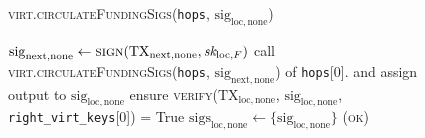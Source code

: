 \begin{figure}[H]
\begin{processbox}{\textsc{virt.circulateFundingSigs}(\texttt{hops},
      $\mathrm{sig}_{\mathrm{loc}, \mathrm{none}}$)}
\begin{algorithmic}[1]
        \State $\mathrm{sig}_{\mathrm{next}, \mathrm{none}} \gets
        \textsc{sign}(\mathrm{TX}_{\mathrm{next}, \mathrm{none}},
        \textit{sk}_{\mathrm{loc}, F})$
        \State call \textsc{virt.circulateFundingSigs}(\texttt{hops},
        $\mathrm{sig}_{\mathrm{next}, \mathrm{none}}$) of \texttt{hops}[0].\bob
        and assign output to $\mathrm{sig}_{\mathrm{loc}, \mathrm{none}}$
        \State ensure \textsc{verify}($\mathrm{TX}_{\mathrm{loc},
        \mathrm{none}}$, $\mathrm{sig}_{\mathrm{loc}, \mathrm{none}}$,
        \texttt{right\_virt\_keys}[0]) = True
        \State $\mathrm{sigs}_{\mathrm{loc}, \mathrm{none}} \gets \{
        \mathrm{sig}_{\mathrm{loc}, \mathrm{none}} \}$
        \State \Return (\textsc{ok})
      \EndIf
    \end{algorithmic}
  \end{processbox}
  \caption{}
  \label{code:virtual-layer:funding-sigs}
\end{figure}

